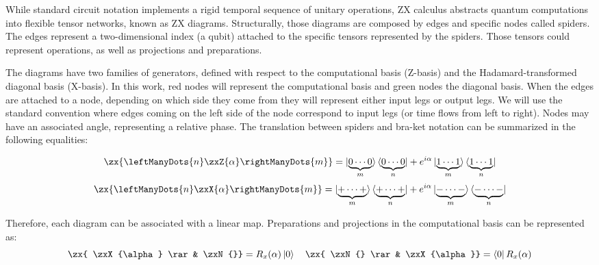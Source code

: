 \documentclass[12pt, twoside, openany]{book}
\begin{document}
While standard circuit notation implements a rigid temporal sequence of unitary operations, ZX calculus abstracts quantum computations into flexible tensor networks, known as ZX diagrams. Structurally, those diagrams are composed by edges and specific nodes called spiders. The edges represent a two-dimensional index (a qubit) attached to the specific tensors represented by the spiders. Those tensors could represent operations, as well as projections and preparations.

The diagrams have two families of generators, defined with respect to the computational basis (Z-basis) and the Hadamard-transformed diagonal basis (X-basis). In this work, red nodes will represent the computational basis and green nodes the diagonal basis. When the edges are attached to a node, depending on which side they come from they will represent either input legs or output legs. We will use the standard convention where edges coming on the left side of the node correspond to input legs (or time flows from left to right). Nodes may have an associated angle, representing a relative phase. The translation between spiders and bra-ket notation can be summarized in the following equalities:

\begin{equation} \label{ZX_spiders}
\zx{ \leftManyDots{n} \zxZ{\alpha} \rightManyDots{m}} = \ket{\underbrace{0 \cdots 0}_{m}} \bra{\underbrace{0 \cdots 0}_{n}} + e^{i \alpha} \ket{{\underbrace{1 \cdots 1}_{m}}} \bra{\underbrace{1 \cdots 1}_{n}} 
\end{equation}
\begin{equation*}
\zx{\leftManyDots{n} \zxX{\alpha} \rightManyDots{m}} = \ket{\underbrace{+ \cdots +}_{m}} \bra{\underbrace{+ \cdots +}_{n}} + e^{i \alpha} \ket{{\underbrace{- \cdots -}_{m}}} \bra{\underbrace{- \cdots -}_{n}}
\end{equation*}

Therefore, each diagram can be associated with a linear map. Preparations and projections in the computational basis can be represented as:
\begin{equation}
    \zx{ \zxX{\alpha} \rar & \zxN{}} = R_x (\alpha) \ket{0} \quad \zx{ \zxN{} \rar & \zxX{\alpha}} = \bra{0} R_x  (\alpha)
\end{equation}
\end{document}
